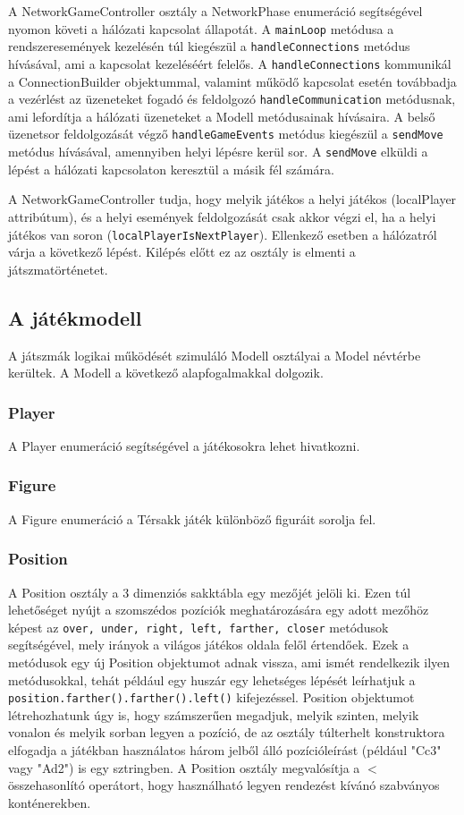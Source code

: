 \documentclass[12pt, twoside]{report}
\begin{document}
A NetworkGameController osztály a NetworkPhase enumeráció segítségével nyomon követi a hálózati kapcsolat állapotát. A {\tt mainLoop} metódusa a rendszeresemények kezelésén túl kiegészül a {\tt handleConnections} metódus hívásával, ami a kapcsolat kezeléséért felelős. A {\tt handleConnections} kommunikál a ConnectionBuilder objektummal, valamint működő kapcsolat esetén továbbadja a vezérlést az üzeneteket fogadó és feldolgozó {\tt handleCommunication} metódusnak, ami lefordítja a hálózati üzeneteket a Modell metódusainak hívásaira. A belső üzenetsor feldolgozását végző {\tt handleGameEvents} metódus kiegészül a {\tt sendMove} metódus hívásával, amennyiben helyi lépésre kerül sor. A {\tt sendMove} elküldi a lépést a hálózati kapcsolaton keresztül a másik fél számára. 

A NetworkGameController tudja, hogy melyik játékos a helyi játékos (localPlayer attribútum), és a helyi események feldolgozását csak akkor végzi el, ha a helyi játékos van soron ({\tt localPlayerIsNextPlayer}). Ellenkező esetben a hálózatról várja a következő lépést. Kilépés előtt ez az osztály is elmenti a játszmatörténetet.

\subsection {A játékmodell}

A játszmák logikai működését szimuláló Modell osztályai a Model névtérbe kerültek. A Modell a következő alapfogalmakkal dolgozik.

\subsubsection {Player}
A Player enumeráció segítségével a játékosokra lehet hivatkozni.

\subsubsection{Figure}
A Figure enumeráció a Térsakk játék különböző figuráit sorolja fel.

\subsubsection{Position}
A Position osztály a 3 dimenziós sakktábla egy mezőjét jelöli ki. Ezen túl lehetőséget nyújt a szomszédos pozíciók meghatározására egy adott mezőhöz képest az {\tt over, under, right, left, farther, closer} metódusok segítségével, mely irányok a világos játékos oldala felől értendőek. Ezek a metódusok egy új Position objektumot adnak vissza, ami ismét rendelkezik ilyen metódusokkal, tehát például egy huszár egy lehetséges lépését leírhatjuk a {\tt position.farther().farther().left()} kifejezéssel. Position objektumot létrehozhatunk úgy is, hogy számszerűen megadjuk, melyik szinten, melyik vonalon és melyik sorban legyen a pozíció, de az osztály túlterhelt konstruktora elfogadja a játékban használatos három jelből álló pozícióleírást (például "Cc3" vagy "Ad2") is egy sztringben. A Position osztály megvalósítja a $<$ összehasonlító operátort, hogy használható legyen rendezést kívánó szabványos konténerekben.
\end{document}
